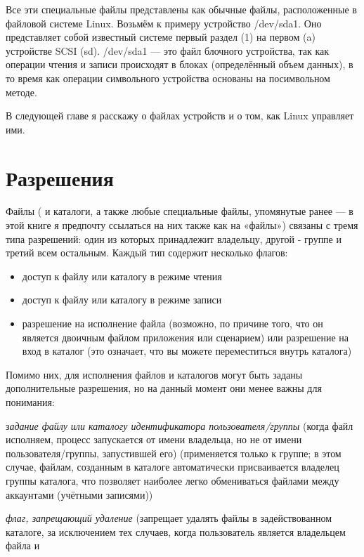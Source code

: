 \documentclass[10pt]{book}
\begin{document}
Все эти специальные файлы представлены как обычные файлы, расположенные  в файловой системе Linux. Возьмём к примеру устройство /dev/sda1. Оно представляет собой известный системе первый раздел (1) на первом (a) устройстве SCSI (sd). /dev/sda1 — это файл блочного устройства, так как операции чтения и записи происходят в блоках (определённый объем данных), в то время как операции символьного устройства основаны на посимвольном методе.

В следующей главе я расскажу о файлах устройств и о том, как Linux управляет ими.

\section{Разрешения}

Файлы ( и каталоги, а также любые специальные файлы, упомянутые ранее — в этой книге я предпочту ссылаться на них также как на «файлы») связаны с тремя типа разрешений: один из которых принадлежит владельцу, другой - группе и третий всем остальным. Каждый тип содержит несколько флагов:

\begin{itemize}
	\item доступ к файлу или каталогу в режиме чтения
	\item доступ к файлу или каталогу в режиме записи
	\item разрешение на исполнение файла (возможно, по причине того, что он является двоичным файлом приложения или сценарием) или разрешение на вход в каталог (это означает, что вы можете переместиться внутрь каталога)
\end{itemize}

Помимо них, для исполнения файлов и каталогов могут быть заданы дополнительные разрешения, но на данный момент они менее важны для понимания:

\begin{description}
	\item з\emph{адание файлу или каталогу идентификатора пользователя/группы} (когда файл исполняем, процесс запускается от имени владельца, но не от имени пользователя/группы, запустившей его) (применяется только к группе; в этом случае, файлам, созданным в каталоге автоматически присваивается владелец группы каталога, что позволяет наиболее легко обмениваться файлами между аккаунтами (учётными записями))
	\item\emph{ флаг, запрещающий удаление} (запрещает удалять файлы в задействованном каталоге, за исключением тех случаев, когда пользователь является владельцем файла и 
\end{description}
\end{document}
